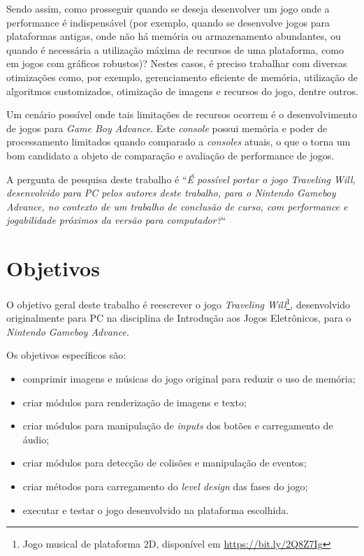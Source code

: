Sendo assim, como prosseguir quando se deseja desenvolver um jogo onde a performance é indispensável (por exemplo, quando se desenvolve jogos para plataformas antigas, onde não há memória ou armazenamento abundantes, ou quando é necessária a utilização máxima de recursos de uma plataforma, como em jogos com gráficos robustos)? Nestes casos, é preciso trabalhar com diversas otimizações como, por exemplo, gerenciamento eficiente de memória, utilização de algoritmos customizados, otimização de imagens e recursos do jogo, dentre outros.

Um cenário possível onde tais limitações de recursos ocorrem é o desenvolvimento de jogos para \textit{Game Boy Advance}. Este \textit{console} possui memória e poder de processamento limitados quando comparado a \textit{consoles} atuais, o que o torna um bom candidato a objeto de comparação e avaliação de performance de jogos.

A pergunta de pesquisa deste trabalho é ``\textit{É possível portar o jogo Traveling Will, desenvolvido para PC pelos autores deste trabalho, para o Nintendo Gameboy Advance, no contexto de um trabalho de conclusão de curso, com performance e jogabilidade próximos da versão para computador?}``

\section*{Objetivos}

O objetivo geral deste trabalho é reescrever o jogo \textit{Traveling Will}\footnote{Jogo musical de plataforma 2D, disponível em \url{https://bit.ly/2Q8Z7Ig}}, desenvolvido originalmente para PC na disciplina de Introdução aos Jogos Eletrônicos, para o \textit{Nintendo Gameboy Advance}.

Os objetivos específicos são:

\begin{itemize}
\item comprimir imagens e músicas do jogo original para reduzir o uso de memória;
\item criar módulos para renderização de imagens e texto;
\item criar módulos para manipulação de \textit{inputs} dos botões e carregamento de áudio;
\item criar módulos para detecção de colisões e manipulação de eventos;
\item criar métodos para carregamento do \textit{level design} das fases do jogo;
\item executar e testar o jogo desenvolvido na plataforma escolhida.
\end{itemize}


